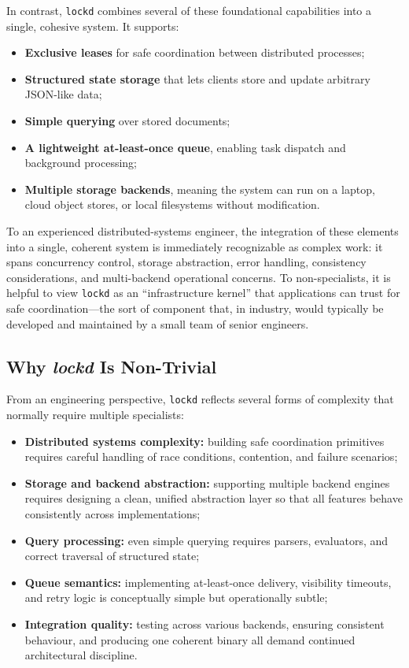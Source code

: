 \documentclass[11pt, a4paper, twocolumn]{article} %
\begin{document}
In contrast, \texttt{lockd} combines several of these foundational capabilities
into a single, cohesive system. It supports:
\begin{itemize}
    \item \textbf{Exclusive leases} for safe coordination between distributed
    processes;
    \item \textbf{Structured state storage} that lets clients store and update
    arbitrary JSON-like data;
    \item \textbf{Simple querying} over stored documents;
    \item \textbf{A lightweight at-least-once queue}, enabling task dispatch and
    background processing;
    \item \textbf{Multiple storage backends}, meaning the system can run on a
    laptop, cloud object stores, or local filesystems without modification.
\end{itemize}

To an experienced distributed-systems engineer, the integration of these
elements into a single, coherent system is immediately recognizable as complex
work: it spans concurrency control, storage abstraction, error handling,
consistency considerations, and multi-backend operational concerns. To
non-specialists, it is helpful to view \texttt{lockd} as an ``infrastructure
kernel'' that applications can trust for safe coordination---the sort of
component that, in industry, would typically be developed and maintained by a
small team of senior engineers.

\subsection*{Why \textit{lockd} Is Non-Trivial}

From an engineering perspective, \texttt{lockd} reflects several forms of
complexity that normally require multiple specialists:
\begin{itemize}
    \item \textbf{Distributed systems complexity:} building safe coordination
    primitives requires careful handling of race conditions, contention, and
    failure scenarios;
    \item \textbf{Storage and backend abstraction:} supporting multiple backend
    engines requires designing a clean, unified abstraction layer so that all
    features behave consistently across implementations;
    \item \textbf{Query processing:} even simple querying requires parsers,
    evaluators, and correct traversal of structured state;
    \item \textbf{Queue semantics:} implementing at-least-once delivery,
    visibility timeouts, and retry logic is conceptually simple but operationally
    subtle;
    \item \textbf{Integration quality:} testing across various backends, ensuring
    consistent behaviour, and producing one coherent binary all demand continued
    architectural discipline.
\end{itemize}
\end{document}
